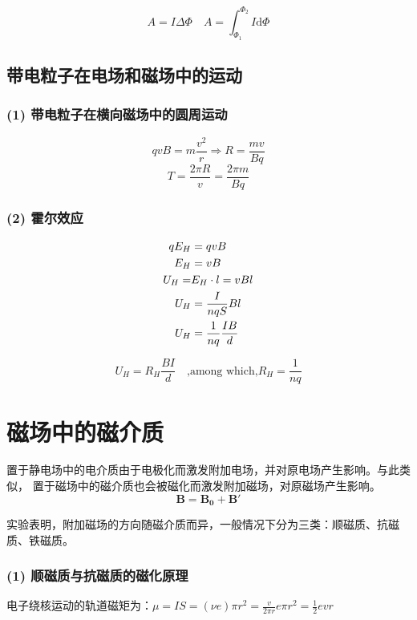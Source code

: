 $$
A=I \Delta \Phi\quad A=\int_{\Phi_1}^{\Phi_2}I\mathrm{d}\Phi
$$

\subsection{带电粒子在电场和磁场中的运动}

\subsubsection{(1) 带电粒子在横向磁场中的圆周运动}

$$
qvB=m \frac{v^{2}}{r}\Rightarrow R=\frac{mv}{Bq}
$$
$$
T=\frac{2\pi R}{v}=\frac{2\pi m}{Bq}
$$

\subsubsection{(2) 霍尔效应}


\begin{align}
  qE_H&=qvB \notag\\
  E_H&=vB\notag\\
  U_H=&E_H\cdot l=vBl\notag\\
  U_H&=\frac{I}{nqS}Bl\notag\\
  U_H&=\frac{1}{nq} \frac{IB}{d}\notag
\end{align}


\begin{equation}
  \label{Hall-effect}
  U_{H}=R_{H}\frac{BI}{d}\quad \text{,among which,} R_H=\frac{1}{nq}
\end{equation}

\section{磁场中的磁介质}
置于静电场中的电介质由于电极化而激发附加电场，并对原电场产生影响。与此类似，
置于磁场中的磁介质也会被磁化而激发附加磁场，对原磁场产生影响。
$$
\boldsymbol{B}=\boldsymbol{B_0}+\boldsymbol{B}'
$$

实验表明，附加磁场的方向随磁介质而异，一般情况下分为三类：顺磁质、抗磁质、铁磁质。

\subsubsection{(1) 顺磁质与抗磁质的磁化原理}

电子绕核运动的轨道磁矩为：$\displaystyle \mu=IS=(\nu e)\pi r^{2}=\frac{v}{2\pi r}e \pi r^{2}=\frac{1}{2}evr$

